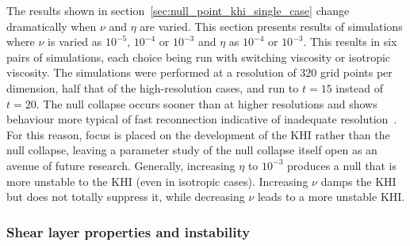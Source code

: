 The results shown in section~\ref{sec:null_point_khi_single_case} change dramatically when $\nu$ and $\eta$ are varied. This section presents results of simulations where $\nu$ is varied as $10^{-5}$, $10^{-4}$ or $10^{-3}$ and $\eta$ as $10^{-4}$ or $10^{-3}$. This results in six pairs of simulations, each choice being run with switching viscosity or isotropic viscosity. The simulations were performed at a resolution of $320$ grid points per dimension, half that of the high-resolution cases, and run to $t=15$ instead of $t=20$. The null collapse occurs sooner than at higher resolutions and shows behaviour more typical of fast reconnection indicative of inadequate resolution~\cite{miyamaNumericalAstrophysicsProceedings2012}. For this reason, focus is placed on the development of the KHI rather than the null collapse, leaving a parameter study of the null collapse itself open as an avenue of future research. Generally, increasing $\eta$ to $10^{-3}$ produces a null that is more unstable to the KHI (even in isotropic cases). Increasing $\nu$ damps the KHI but does not totally suppress it, while decreasing $\nu$ leads to a more unstable KHI.

\subsubsection{Shear layer properties and instability}

